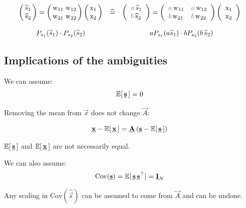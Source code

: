 \begin{frame}
{\footnotesize
\begin{equation*}
	\begin{array}{ccc}
	\arraycolsep=1.4pt
	\left( \begin{array}{ll}
		\widehat{s}_1 \\ \widehat{s}_2
	\end{array} \right)
	=
	\left( \begin{array}{ll}
		\mathrm{w}_{11} & \mathrm{w}_{12} \\
		\mathrm{w}_{21} & \mathrm{w}_{22} 
	\end{array} \right)
	\left( \begin{array}{ll}
		\mathrm{x}_1 \\ \mathrm{x}_2
	\end{array} \right)
	& \corresponds &
	\left( \begin{array}{ll}
		\textcolor{gray}{a}\,\widehat{s}_1 \\ 
                 \textcolor{gray}{b}\,\widehat{s}_2
	\end{array} \right)
	=
	\left( \begin{array}{ll}
		\textcolor{gray}{a}\,\mathrm{w}_{11} & \textcolor{gray}{a}\,\mathrm{w}_{12} \\
		\textcolor{gray}{b}\,\mathrm{w}_{21} & \textcolor{gray}{b}\,\mathrm{w}_{22} 
	\end{array} \right)
	\left( \begin{array}{ll}
		\mathrm{x}_1 \\ \mathrm{x}_2
	\end{array} \right)
	\\\\
	P_{s_1} (\widehat{s}_1) \cdot P_{s_2} (\widehat{s}_2)
	&& 
	aP_{s_1} (a\widehat{s}_1) \cdot bP_{s_2} (b\, \widehat{s}_2)
	\end{array}
\end{equation*}
}
\end{frame}
\subsection{Implications of the ambiguities}

\begin{frame}

We can assume:
$$
\mathbb{E} \lbrack \, \underline{\mathbf{s}} \, \rbrack = 0
$$

Removing the mean from $\vec x$ does not change $\vec A$:

$$
\underline{\mathbf{x}} - \mathbb{E} \lbrack \, \underline{\mathbf{x}} \, \rbrack = \underline{\mathbf{A}} \left( \underline{\mathbf{s}} - \mathbb{E} \lbrack \, \underline{\mathbf{s}} \, \rbrack \right)
$$

 $\mathbb{E} \lbrack \, \underline{\mathbf{s}} \, \rbrack$ and $\mathbb{E} \lbrack \, \underline{\mathbf{x}} \, \rbrack$ are not necessarily equal.
\pause

We can also assume:
$$
\mathrm{Cov}(\underline{\mathbf{s}}) = \mathbb{E} \lbrack \, \underline{\mathbf{s}} \, \underline{\mathbf{s}}^\top \rbrack = \underline{\mathbf{I}}_N
$$

Any scaling in $\mathrm{Cov}(\widehat{\vec s})$ can be assumed to come from $\vec A$ and can be undone.

\end{frame}



